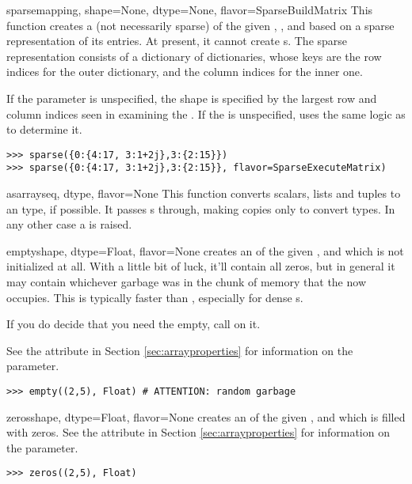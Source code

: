 \begin{funcdesc}{sparse}{mapping, shape=None, dtype=None, flavor=SparseBuildMatrix}
  This function creates a (not necessarily sparse)  of
  the given , , and  based on
  a sparse representation of its entries. At present, it cannot create
  s. The sparse representation consists of a dictionary
  of dictionaries, whose keys are the row indices for the outer dictionary,
  and the column indices for the inner one.

  If the  parameter is unspecified, the shape is specified by
  the largest row and column indices seen in examining the .
  If the  is unspecified,  uses the same
  logic as  to determine it.
\begin{verbatim}
>>> sparse({0:{4:17, 3:1+2j},3:{2:15}})
>>> sparse({0:{4:17, 3:1+2j},3:{2:15}}, flavor=SparseExecuteMatrix)
\end{verbatim}
\end{funcdesc}

\begin{funcdesc}{asarray}{seq, dtype, flavor=None}
  This function converts scalars, lists and tuples to an
   type, if possible. It passes s through,
  making copies only to convert types.  In any other case a
   is raised.
\end{funcdesc}

\begin{funcdesc}{empty}{shape, dtype=Float, flavor=None}
   creates an  of the given ,
   and  which is not initialized at all. 
  With a little bit of luck, it'll contain all zeros, but in general
  it may contain whichever garbage was in the chunk of memory that
  the  now occupies. This is typically faster
  than , especially for dense s.

  If you do decide that you need the  empty, call
   on it.

  See the  attribute in Section \ref{sec:arrayproperties} for
  information on the  parameter.

\begin{verbatim}
>>> empty((2,5), Float) # ATTENTION: random garbage
\end{verbatim}
\end{funcdesc}
\begin{funcdesc}{zeros}{shape, dtype=Float, flavor=None}
   creates an  of the given ,
   and  which is filled with zeros. See the
   attribute in Section \ref{sec:arrayproperties} for
  information on the  parameter.
\begin{verbatim}
>>> zeros((2,5), Float)
\end{verbatim}
\end{funcdesc}

